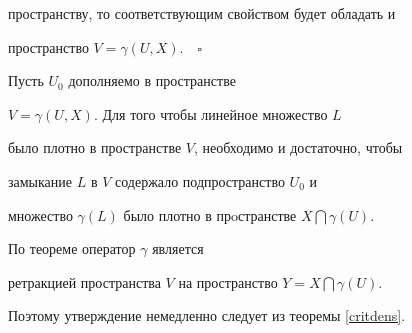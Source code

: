 пространству, то соответствующим свойством будет обладать и


пространство $V=\gamma (U,X)$.$\quad\square$





\begin{cor}


Пусть $U_0$ дополняемо в пространстве


$V=\gamma(U,X)$. Для того чтобы линейное множество $L$


было плотно в пространстве $V$, необходимо и достаточно, чтобы


замыкание $L$ в $V$ содержало подпространство $U_0$ и


множество $\gamma(L)$ было плотно в прoстранстве $X \bigcap \gamma(U)$.


\end{cor}





\begin{pf}


По теореме оператор $\gamma$ является


ретракцией пространства $V$ на пространство $Y=X \bigcap \gamma(U)$.


Поэтому утверждение немедленно следует из теоремы \ref{critdens}.


\end{pf}





